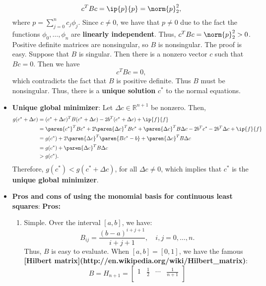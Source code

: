 \documentclass{report}
\begin{document}
\begin{itemize}
                $$c^T B c = \ip{p}{p} = \norm{p}_2^2,$$
                where $p = \sum_{j=0}^n c_j \phi_j$. Since $c \neq 0$, we have that $p \neq 0$ due to the fact the functions $\phi_0,\ldots,\phi_n$ are \textbf{linearly independent}. Thus, $c^T B c = \norm{p}_2^2 > 0$.
                \bigbreak \noindent 
                Positive definite matrices are nonsingular, so $B$ is nonsingular.
                \bigbreak \noindent 
                The proof is easy. Suppose that $B$ is singular. Then there is a nonzero vector $c$ such that $Bc = 0$. Then we have
                $$c^T B c = 0,$$
                which contradicts the fact that $B$ is positive definite. Thus $B$ must be nonsingular.
                Thus, there is a \textbf{unique solution} $c^*$ to the normal equations.
            \item \textbf{ Unique global minimizer}:
                Let $\Delta c \in \mathbb{R}^{n+1}$ be nonzero. Then,
                $$
                \begin{align}
                    g(c^* + \Delta c) 
&=  (c^* + \Delta c)^T B (c^* + \Delta c) - 2b^T (c^* + \Delta c) + \ip{f}{f}\\
&=  \paren{c^*}^T B c^* + 2\paren{\Delta c}^T B c^* +  \paren{\Delta c}^T B \Delta c - 2b^T c^* - 2b^T \Delta c + \ip{f}{f}\\
&= g(c^*) + 2\paren{\Delta c}^T \paren{B c^* - b} +  \paren{\Delta c}^T B \Delta c \\
&= g(c^*) +  \paren{\Delta c}^T B \Delta c \\
&> g(c^*). \\
                \end{align}
                $$
                Therefore, $g(c^*) < g(c^* + \Delta c)$, for all $\Delta c \neq 0$, which implies that $c^*$ is the \textbf{unique global minimizer}.
            \item \textbf{Pros and cons of using the monomial basis for continuous least squares}:
                \textbf{Pros:}
                \begin{enumerate}
                    \item Simple. Over the interval $[a,b]$, we have:
                    $$B_{ij} = \frac{(b-a)^{i+j+1}}{i+j+1}, \quad i,j = 0,\ldots,n.$$
                    Thus, $B$ is easy to evaluate. When $[a,b] = [0,1]$, we have the famous \textbf{[Hilbert matrix](http://en.wikipedia.org/wiki/Hilbert_matrix)}:
                    $$B = H_{n+1} =
                    \begin{bmatrix}
                        1 & \frac12 & \cdots & \frac{1}{n+1} \\

\end{bmatrix}$$
\end{enumerate}
\end{itemize}
\end{document}
